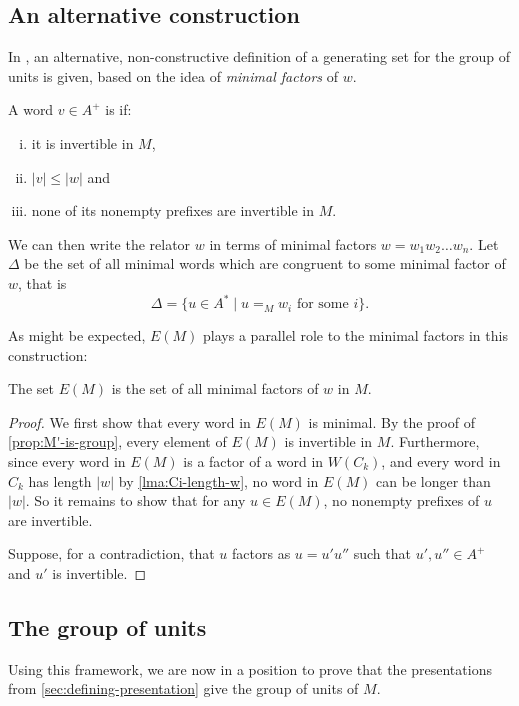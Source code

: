 \documentclass[noindex,noinsetproof,12pt]{lmaths}
\begin{document}
\subsection{An alternative construction}

In \cite{Zhang1992}, an alternative, non-constructive definition of a generating set for the group of units is given, based on the idea of \emph{minimal factors} of $w$.

\begin{defn}
	A word $v \in A^+$ is  if:
	\begin{enumerate}[(i)]
		\item it is invertible in $M$,
		\item $|v| \le |w|$ and
		\item none of its nonempty prefixes are invertible in $M$.
	\end{enumerate}
\end{defn}

We can then write the relator $w$ in terms of minimal factors $w = w_1w_2\ldots w_n$. Let $\Delta$ be the set of all minimal words which are congruent to some minimal factor of $w$, that is
	\[ \Delta = \{ u \in A^* \mid u =_M w_i \text{ for some } i \}. \]

As might be expected, $E(M)$ plays a parallel role to the minimal factors in this construction:

\begin{prop}
	The set $E(M)$ is the set of all minimal factors of $w$ in $M$. \incomplete
\end{prop}
\begin{proof}
	We first show that every word in $E(M)$ is minimal. By the proof of \cref{prop:M'-is-group}, every element of $E(M)$ is invertible in $M$. Furthermore, since every word in $E(M)$ is a factor of a word in $W(C_k)$, and every word in $C_k$ has length $|w|$ by \cref{lma:Ci-length-w}, no word in $E(M)$ can be longer than $|w|$. So it remains to show that for any $u \in E(M)$, no nonempty prefixes of $u$ are invertible.

	Suppose, for a contradiction, that $u$ factors as $u = u'u''$ such that $u', u'' \in A^+$ and $u'$ is invertible.
\end{proof}


\subsection{The group of units}

Using this framework, we are now in a position to prove that the presentations from \cref{sec:defining-presentation} give the group of units of $M$.
\end{document}
